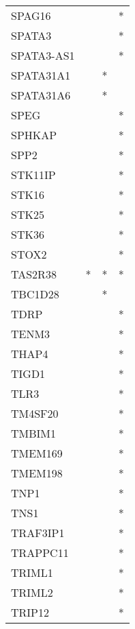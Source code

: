 \begin{longtable}{lccc}
SPAG16         &           &     &       * \\
SPATA3         &           &     &       * \\
SPATA3-AS1     &           &     &       * \\
SPATA31A1      &           &   * &         \\
SPATA31A6      &           &   * &         \\
SPEG           &           &     &       * \\
SPHKAP         &           &     &       * \\
SPP2           &           &     &       * \\
STK11IP        &           &     &       * \\
STK16          &           &     &       * \\
STK25          &           &     &       * \\
STK36          &           &     &       * \\
STOX2          &           &     &       * \\
TAS2R38        &         * &   * &       * \\
TBC1D28        &           &   * &         \\
TDRP           &           &     &       * \\
TENM3          &           &     &       * \\
THAP4          &           &     &       * \\
TIGD1          &           &     &       * \\
TLR3           &           &     &       * \\
TM4SF20        &           &     &       * \\
TMBIM1         &           &     &       * \\
TMEM169        &           &     &       * \\
TMEM198        &           &     &       * \\
TNP1           &           &     &       * \\
TNS1           &           &     &       * \\
TRAF3IP1       &           &     &       * \\
TRAPPC11       &           &     &       * \\
TRIML1         &           &     &       * \\
TRIML2         &           &     &       * \\
TRIP12         &           &     &       * \\

\end{longtable}
